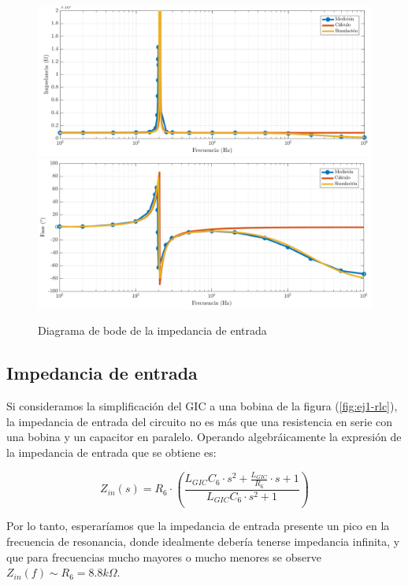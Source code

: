 \documentclass[../../tc_tp3_main.tex]{subfiles}
\begin{document}
\begin{figure}[b]
	\centering
  	\includegraphics[scale = 0.5]{imagenes/tc_tp3_ej1_zin_x1_mag.png}
  	\includegraphics[scale = 0.5]{imagenes/tc_tp3_ej1_zin_x1_fase.png}
  	\caption{Diagrama de bode de la impedancia de entrada}
  	\label{fig:1-zin}
\end{figure}


\subsection{Impedancia de entrada}


Si consideramos la simplificaci\'on del GIC a una bobina de la figura (\ref{fig:ej1-rlc}), la impedancia de entrada del circuito no es m\'as que una resistencia en serie con una bobina y un capacitor en paralelo. Operando algebr\'aicamente la expresi\'on de la impedancia de entrada que se obtiene es:

\begin{equation}
	Z_{in}(s) = R_6 \cdot \left( \frac{L_{GIC}C_6 \cdot s^2 + \frac{L_{GIC}}{R_6} \cdot s + 1}{L_{GIC}C_6 \cdot s^2 +1} \right) 
\end{equation}

Por lo tanto, esperar\'iamos que la impedancia de entrada presente un pico en la frecuencia de resonancia, donde idealmente deber\'ia tenerse impedancia infinita, y que para frecuencias mucho mayores o mucho menores se observe $Z_{in}(f) \sim R_6 = 8.8k\Omega$.\par
\end{document}
